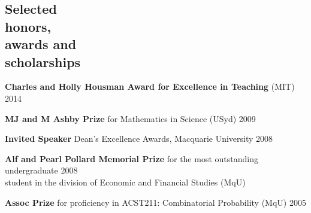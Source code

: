 \documentclass[margin,line]{resume}
\newcommand{\CVsection}[1]{\section{\mysidestyle #1}}
\newcommand{\entry}[3]{\textbf{#1} #2 \hfill {#3}
           
\vspace{-3.1mm}}
\newcommand{\twolineentry}[4]{\textbf{#1} #2 \hfill {#4}\\%
#3
           
\vspace{-3.1mm}}
\newcommand{\FINALtwolineentry}[4]{\textbf{#1} #2 \hfill {#4}\\%
#3}
\begin{document}
\begin{resume}
\CVsection{Selected\\honors,\\awards and\\scholarships} 
\entry{Charles and Holly Housman Award for Excellence in Teaching}{(MIT)}{2014}
\entry{MJ and M Ashby Prize}{for Mathematics in Science (USyd)}{2009}
\entry{Invited Speaker}{Dean's Excellence Awards, Macquarie University}{2008}
\twolineentry{Alf and Pearl Pollard Memorial Prize}{for the most outstanding undergraduate}{student in the division of Economic and Financial Studies (MqU)}{2008}
\entry{Assoc Prize}{for proficiency in ACST211: Combinatorial Probability (MqU)}{2005}





\end{resume}
\end{document}
